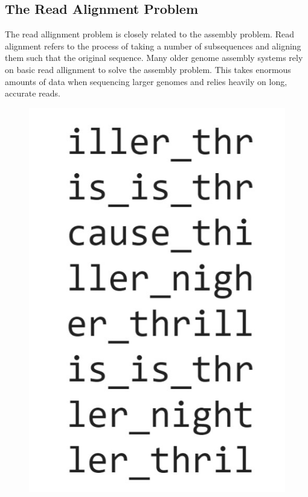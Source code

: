 \documentclass[letterpaper, 10 pt]{ieeeconf}
\begin{document}
  \subsection{The Read Alignment Problem}
  The read allignment problem is closely related to the assembly problem.  Read
  alignment refers to the process of taking a number of subsequences and aligning
  them such that the original sequence.  Many older genome assembly systems rely
  on basic read allignment to solve the assembly problem.  This takes enormous
  amounts of data when sequencing larger genomes and relies heavily on long, accurate
  reads.

  \begin{figure}[thpb]
    \centering
    \includegraphics[scale=0.3]{images/fig1-1.jpg}

\end{figure}
\end{document}
